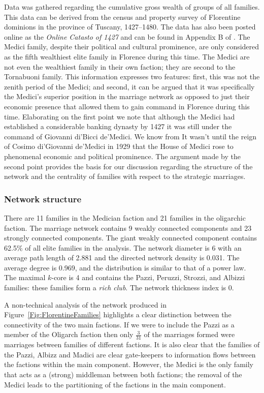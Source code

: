 Data was gathered regarding the cumulative gross wealth of groups of all families. This data can be derived from the census and property survey of Florentine dominions in the province of Tuscany, 1427--1480. The data has also been posted online as the \emph{Online Catasto of 1427} and can be found in Appendix B of \citet{Padgett1993}. The Medici family, despite their political and cultural prominence, are only considered as the fifth wealthiest elite family in Florence during this time. The Medici are not even the wealthiest family in their own faction; they are second to the Tornabuoni family. This information expresses two features: first, this was not the zenith period of the Medici; and second, it can be argued that it was specifically the Medici's superior position in the marriage network as opposed to just their economic presence that allowed them to gain command in Florence during this time. Elaborating on the first point we note that although the Medici had established a considerable banking dynasty by 1427 it was still under the command of Giovanni di'Bicci de'Medici. We know from  It wasn't until the reign of Cosimo di'Giovanni de'Medici in 1929 that the House of Medici rose to phenomenal economic and political prominence. The argument made by the second point provides the basis for our discussion regarding the structure of the network and the centrality of families with respect to the strategic marriages.

\subsubsection{Network structure}

There are 11 families in the Medician faction and 21 families in the oligarchic faction. The marriage network contains 9 weakly connected components and 23 strongly connected components. The giant weakly connected component contains 62.5\% of all elite families in the analysis. The network diameter is 6 with an average path length of 2.881 and the directed network density is 0.031. The average degree is 0.969, and the distribution is similar to that of a power law. The maximal $k$-core is 4 and contains the Pazzi, Peruzzi, Strozzi, and Albizzi families: these families form a \emph{rich club}. The network thickness index is 0.

A non-technical analysis of the network produced in Figure~\ref{Fig:FlorentineFamilies} highlights a clear distinction between the connectivity of the two main factions. If we were to include the Pazzi as a member of the Oligarch faction then only $\frac{3}{31}$ of the marriages formed were marriages between families of different factions. It is also clear that the families of the Pazzi, Albizz and Madici are clear gate-keepers to information flows between the factions within the main component. However, the Medici is the only family that acts as a (strong) middleman between both factions; the removal of the Medici leads to the partitioning of the factions in the main component.

